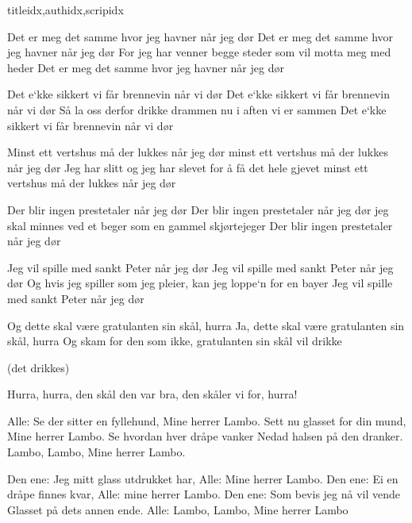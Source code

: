 \documentclass[14pt,letterpaper,norsk]{article}
\begin{document}
\begin{songs}{titleidx,authidx,scripidx}
\begin{intersong*}
{%
\parindent 0pt
\noindent
\ifx\preLilyPondExample \undefined
\else
  \expandafter\preLilyPondExample
\fi
\def\lilypondbook{}%

\ifx\postLilyPondExample \undefined
\else
  \expandafter\postLilyPondExample
\fi
}
\end{intersong*}

\beginverse
Det er meg det samme hvor jeg havner når jeg dør
Det er meg det samme hvor jeg havner når jeg dør
For jeg har venner begge steder som vil motta meg med heder
Det er meg det samme hvor jeg havner når jeg dør
\endverse

\beginverse
Det e`kke sikkert vi får brennevin når vi dør
Det e`kke sikkert vi får brennevin når vi dør
Så la oss derfor drikke drammen nu i aften vi er sammen
Det e`kke sikkert vi får brennevin når vi dør
\endverse

\beginverse
Minst ett vertshus må der lukkes når jeg dør
minst ett vertshus må der lukkes når jeg dør
Jeg har slitt og jeg har slevet for å få det hele gjevet
minst ett vertshus må der lukkes når jeg dør
\endverse

\beginverse
Der blir ingen prestetaler når jeg dør
Der blir ingen prestetaler når jeg dør
jeg skal minnes ved et beger som en gammel skjørtejeger
Der blir ingen prestetaler når jeg dør
\endverse

\beginverse
Jeg vil spille med sankt Peter når jeg dør
Jeg vil spille med sankt Peter når jeg dør
Og hvis jeg spiller som jeg pleier, kan jeg loppe`n for en bayer
Jeg vil spille med sankt Peter når jeg dør
\endverse
\endsong

\beginverse
Og dette skal være gratulanten sin skål, hurra
Ja, dette skal være gratulanten sin skål, hurra
Og skam for den som ikke, gratulanten sin skål vil drikke

(det drikkes)

Hurra, hurra, den skål den var bra, den skåler vi for, hurra!
\endverse
\endsong


\beginverse
Alle: Se der sitter en fyllehund,
Mine herrer Lambo.
Sett nu glasset for din mund,
Mine herrer Lambo.
Se hvordan hver dråpe vanker
Nedad halsen på den dranker.
Lambo, Lambo,
Mine herrer Lambo.
\endverse

\beginverse
Den ene: Jeg mitt glass utdrukket har,
Alle: Mine herrer Lambo.
Den ene: Ei en dråpe finnes kvar,
Alle: mine herrer Lambo.
Den ene: Som bevis jeg nå vil vende
Glasset på dets annen ende.
Alle: Lambo, Lambo,
Mine herrer Lambo
\endverse


\end{songs}
\end{document}
